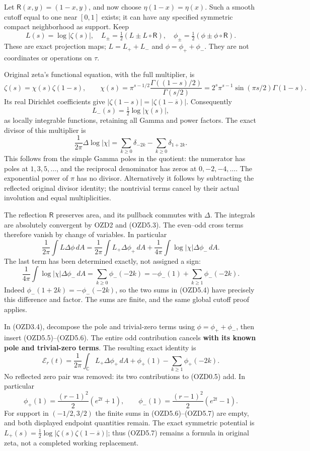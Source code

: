 Let \(\mathsf R(x,y)=(1-x,y)\), and now choose \(\eta(1-x)=\eta(x)\).
Such a smooth cutoff equal to one near \([0,1]\) exists; it can have any
specified symmetric compact neighborhood as support. Keep \[
L(s)=\log|\zeta(s)|,\quad
L_\pm=\tfrac12(L\pm L\circ\mathsf R),\quad
\phi_\pm=\tfrac12(\phi\pm\phi\circ\mathsf R).
\tag{OZD5.1}
\] These are exact projection maps; \(L=L_++L_-\) and
\(\phi=\phi_++\phi_-\). They are not coordinates or operations on
\(\tau\).

Original zeta's functional equation, with the full multiplier, is \[
\zeta(s)=\chi(s)\zeta(1-s),\qquad
\chi(s)=\pi^{s-1/2}\frac{\Gamma((1-s)/2)}{\Gamma(s/2)}
=2^s\pi^{s-1}\sin(\pi s/2)\Gamma(1-s).
\tag{OZD5.2}
\] Its real Dirichlet coefficients give
\(|\zeta(1-s)|=|\zeta(1-\overline s)|\). Consequently \[
L_-(s)=\tfrac12\log|\chi(s)|,
\tag{OZD5.3}
\] as locally integrable functions, retaining all Gamma and power
factors. The exact divisor of this multiplier is \[
\frac1{2\pi}\Delta\log|\chi|
=\sum_{k\ge0}\delta_{-2k}-\sum_{k\ge0}\delta_{1+2k}.
\tag{OZD5.4}
\] This follows from the simple Gamma poles in the quotient: the
numerator has poles at \(1,3,5,\ldots\), and the reciprocal denominator
has zeros at \(0,-2,-4,\ldots\). The exponential power of \(\pi\) has no
divisor. Alternatively it follows by subtracting the reflected original
divisor identity; the nontrivial terms cancel by their actual involution
and equal multiplicities.

The reflection \(\mathsf R\) preserves area, and its pullback commutes
with \(\Delta\). The integrals are absolutely convergent by OZD2 and
(OZD5.3). The even--odd cross terms therefore vanish by change of
variables. In particular \[
\frac1{2\pi}\int L\Delta\phi\,dA
=\frac1{2\pi}\int L_+\Delta\phi_+\,dA
+\frac1{4\pi}\int\log|\chi|\Delta\phi_-\,dA.
\tag{OZD5.5}
\] The last term has been determined exactly, not assigned a sign: \[
\frac1{4\pi}\int\log|\chi|\Delta\phi_-\,dA
=\sum_{k\ge0}\phi_-(-2k)
=-\phi_-(1)+\sum_{k\ge1}\phi_-(-2k).
\tag{OZD5.6}
\] Indeed \(\phi_-(1+2k)=-\phi_-(-2k)\), so the two sums in (OZD5.4)
have precisely this difference and factor. The sums are finite, and the
same global cutoff proof applies.

In (OZD3.4), decompose the pole and trivial-zero terms using
\(\phi=\phi_++\phi_-\), then insert (OZD5.5)--(OZD5.6). The entire odd
contribution cancels \textbf{with its known pole and trivial-zero
terms}. The resulting exact identity is \[
\boxed{\mathcal E_r(t)=\frac1{2\pi}\int_{\mathbb C}L_+\Delta\phi_+\,dA
+\phi_+(1)-\sum_{k\ge1}\phi_+(-2k).}
\tag{OZD5.7}
\] No reflected zero pair was removed: its two contributions to (OZD0.5)
add. In particular \[
\phi_+(1)=\frac{(r-1)^2}{2}(e^{2t}+1),\qquad
\phi_-(1)=\frac{(r-1)^2}{2}(e^{2t}-1).
\tag{OZD5.8}
\] For support in \((-1/2,3/2)\) the finite sums in (OZD5.6)--(OZD5.7)
are empty, and both displayed endpoint quantities remain. The exact
symmetric potential is
\(L_+(s)=\tfrac12\log|\zeta(s)\zeta(1-\overline s)|\); thus (OZD5.7)
remains a formula in original zeta, not a completed working replacement.

